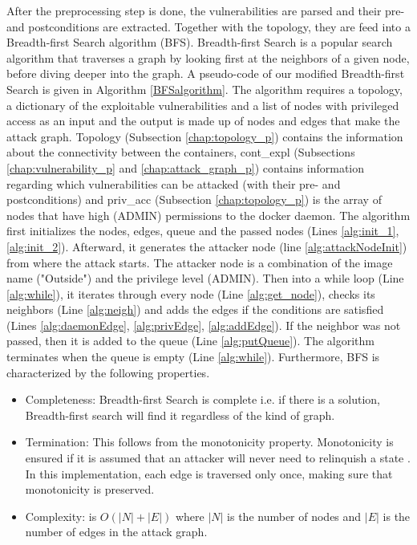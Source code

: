 After the preprocessing step is done, the vulnerabilities are parsed and their pre- and postconditions are extracted. Together with the topology, they are feed into a Breadth-first Search algorithm (BFS).
Breadth-first Search is a popular search algorithm that traverses a graph by looking first at the neighbors of a given node, before diving deeper into the graph. A pseudo-code of our modified Breadth-first Search is given in Algorithm \ref{BFSalgorithm}. The algorithm requires a topology, a dictionary of the exploitable vulnerabilities and a list of nodes with privileged access as an input and the output is made up of nodes and edges that make the attack graph. Topology (Subsection \ref{chap:topology_p}) contains the information about the connectivity between the containers, cont\_expl (Subsections \ref{chap:vulnerability_p} and \ref{chap:attack_graph_p}) contains information regarding which vulnerabilities can be attacked (with their pre- and postconditions) and priv\_acc (Subsection \ref{chap:topology_p}) is the array of nodes that have high (ADMIN) permissions to the docker daemon. The algorithm first initializes the nodes, edges, queue and the passed nodes (Lines \ref{alg:init_1}, \ref{alg:init_2}). Afterward, it generates the attacker node (line \ref{alg:attackNodeInit}) from where the attack starts. The attacker node is a combination of the image name ("Outside") and the privilege level (ADMIN). Then into a while loop (Line \ref{alg:while}), it iterates through every node (Line \ref{alg:get_node}), checks its neighbors (Line \ref{alg:neigh}) and adds the edges if the conditions are satisfied (Lines \ref{alg:daemonEdge}, \ref{alg:privEdge}, \ref{alg:addEdge}). If the neighbor was not passed, then it is added to the queue (Line \ref{alg:putQueue}). The algorithm terminates when the queue is empty (Line \ref{alg:while}). Furthermore, BFS is characterized by the following properties.


\begin{itemize}
	\item Completeness: Breadth-first Search is complete i.e. if there is a solution, Breadth-first search will find it regardless of the kind of graph.
	\item Termination: This follows from the monotonicity property. Monotonicity is ensured if it is assumed that an attacker will never need to relinquish a state \cite{ingols2006practical, ou2006scalable, ammann2002scalable}. In this implementation, each edge is traversed only once, making sure that monotonicity is preserved.
	\item  Complexity: is $O(|N| + |E|)$ where $|N|$ is the number of nodes and $|E|$ is the number of edges in the attack graph.
\end{itemize}


